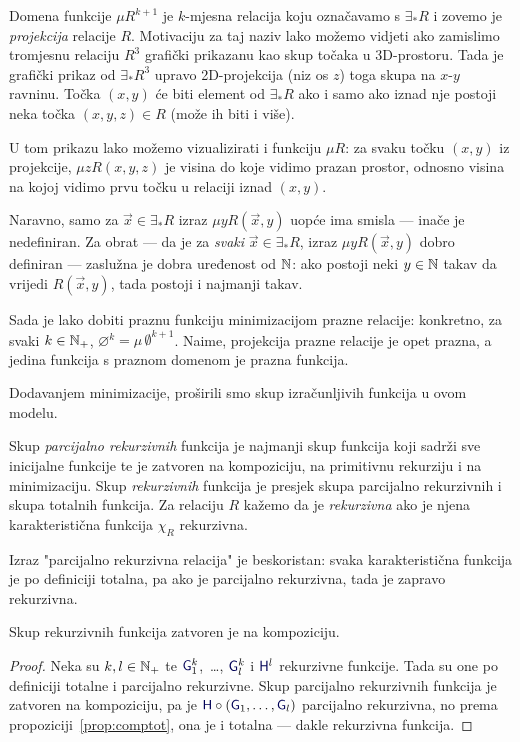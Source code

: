 Domena funkcije $\mu R^{k+1}$ je $k$-mjesna relacija koju označavamo s $\exists_*R$ i zovemo je \emph{projekcija} relacije $R$. Motivaciju za taj naziv lako možemo vidjeti ako zamislimo tromjesnu relaciju $R^3$ grafički prikazanu kao skup točaka u 3D-prostoru. Tada je grafički prikaz od $\exists_*R^3$ upravo 2D-projekcija (niz os $z$) toga skupa na $x$-$y$ ravninu. Točka $(x,y)$ će biti element od $\exists_*R$ ako i samo ako iznad nje postoji neka točka $(x,y,z)\in R$ (može ih biti i više).

U tom prikazu lako možemo vizualizirati i funkciju $\mu R$: za svaku točku $(x,y)$ iz projekcije, $\mu zR(x,y,z)$ je visina do koje vidimo prazan prostor, odnosno visina na kojoj vidimo prvu točku u relaciji iznad $(x,y)$. 

Naravno, samo za $\vec x\in\exists_*R$ izraz $\mu yR(\vec x,y)$ uopće ima smisla --- inače je nedefiniran. Za obrat --- da je za \emph{svaki} $\vec x\in\exists_*R$, izraz $\mu yR(\vec x,y)$ dobro definiran --- zaslužna je dobra uređenost od ${\mathbb N}$: ako postoji neki $y\in{\mathbb N}$ takav da vrijedi $R(\vec x,y)$, tada postoji i najmanji takav.

\begin{primjer}[{name=[prazna funkcija minimizacijom]}]\label{pr:varnothingprek}
Sada je lako dobiti praznu funkciju minimizacijom prazne relacije: konkretno, za svaki $k\in{\mathbb N}_+$, $\varnothing^k=\mu\,\emptyset^{k+1}$. Naime, projekcija prazne relacije je opet prazna, a jedina funkcija s praznom domenom je prazna funkcija.
\end{primjer}

Dodavanjem minimizacije, proširili smo skup izračunljivih funkcija u ovom modelu.

\begin{definicija}[{name=[(parcijalno) rekurzivne funkcije i relacije]}]\label{def:parcrek}
Skup \emph{parcijalno rekurzivnih} funkcija je najmanji skup funkcija koji sadrži sve inicijalne funkcije te je zatvoren na kompoziciju, na primitivnu rekurziju i na minimizaciju. Skup \emph{rekurzivnih} funkcija je presjek skupa parcijalno rekurzivnih i skupa totalnih funkcija. Za relaciju $R$ kažemo da je \emph{rekurzivna} ako je njena karakteristična funkcija $\chi_R$ rekurzivna.
\end{definicija}

Izraz "parcijalno rekurzivna relacija" je beskoristan: svaka karakteristična funkcija je po definiciji totalna, pa ako je parcijalno rekurzivna, tada je zapravo rekurzivna.

\begin{lema}[{name=[zatvorenost skupa rekurzivnih funkcija na kompoziciju]}]\label{lm:comprek}
Skup rekurzivnih funkcija zatvoren je na kompoziciju.
\end{lema}
\begin{proof}
Neka su $k,l\in{\mathbb N}_+$ te $\f G_1^k$,~\ldots, $\f G_l^k$ i $\f H^l$ rekurzivne funkcije. Tada su one po definiciji totalne i parcijalno rekurzivne. Skup parcijalno rekurzivnih funkcija je zatvoren na kompoziciju, pa je $\f H\circ(\f G_1,\dotsc,\f G_l)$ parcijalno rekurzivna, no prema propoziciji~\ref{prop:comptot}, ona je i totalna --- dakle rekurzivna funkcija.
\end{proof}

